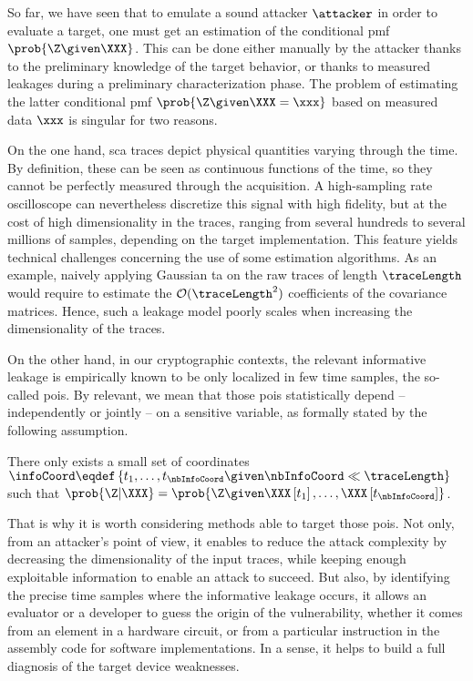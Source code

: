 So far, we have seen that to emulate a sound attacker \(\attacker\) in order to evaluate a target, one must get an estimation of the conditional \gls{pmf} \(\prob{\Z \given \XXX}\).
This can be done either manually by the attacker thanks to the preliminary knowledge of the target behavior, or thanks to measured leakages during a preliminary characterization phase.
The problem of estimating the latter conditional \gls{pmf} \(\prob{\Z \given \XXX = \xxx}\) based on measured data \(\xxx\) is 
singular for two reasons.

On the one hand, \gls{sca} traces depict physical quantities varying through the time.
By definition, these can be seen as continuous functions of the time, so they cannot be perfectly measured through the acquisition.
A high-sampling rate oscilloscope can nevertheless discretize this signal with high fidelity, but at the cost of high dimensionality in the traces, ranging from several hundreds to several millions of samples, depending on the target implementation.
This feature yields technical challenges concerning the use of some estimation algorithms.
As an example, naively applying Gaussian \gls{ta} on the raw traces of length \(\traceLength\) would require to estimate the \(\mathcal{O}(\traceLength^2)\) coefficients of the covariance matrices.
Hence, such a leakage model poorly scales when increasing the dimensionality of the traces.

On the other hand, in our cryptographic contexts, the relevant informative leakage is empirically known to be only localized in few time samples, the so-called \glspl{poi}.
By relevant, we mean that those \glspl{poi} statistically depend -- independently or jointly -- on a sensitive variable, as formally stated by the following assumption.
\begin{assum}[Sparsity]\label{assum:sparsity}
	There only exists a small set of coordinates 
	\(\infoCoord \eqdef \left\{t_1, \ldots, t_{\nbInfoCoord} \given \nbInfoCoord \ll \traceLength \right\}\)
	such that 
	\(\prob{\Z | \XXX} = \prob{\Z \given \XXX \left[t_1\right], \ldots, \XXX \left[t_{\nbInfoCoord}\right]}\).
\end{assum}
That is why it is worth considering methods able to target those \glspl{poi}.
Not only, from an attacker's point of view, it enables to reduce the attack complexity by decreasing the dimensionality of the input traces, while keeping enough exploitable information to enable an attack to succeed.
But also, by identifying the precise time samples where the informative leakage occurs, it allows an evaluator or a developer to guess the origin of the vulnerability, whether it comes from an element in a hardware circuit, or from a particular instruction in the assembly code for software implementations.
In a sense, it helps to build a full diagnosis of the target device weaknesses.

